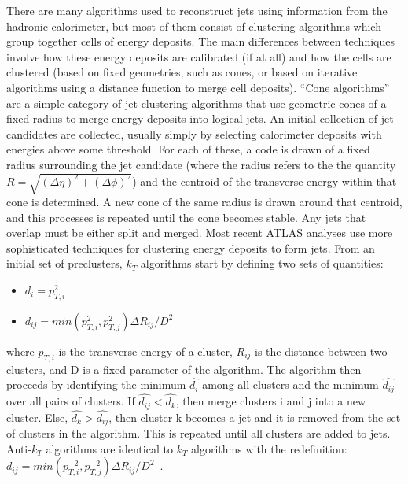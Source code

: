 There are many algorithms used to reconstruct jets using information from the hadronic calorimeter, but most of them consist of clustering algorithms which group together cells of energy deposits.
The main differences between techniques involve how these energy deposits are calibrated (if at all) and how the cells are clustered (based on fixed geometries, such as cones, or based on iterative algorithms using a distance function to merge cell deposits).
``Cone algorithms'' are a simple category of jet clustering algorithms that use geometric cones of a fixed radius to merge energy deposits into logical jets.
An initial collection of jet candidates are collected, usually simply by selecting calorimeter deposits with energies above some threshold.
For each of these, a code is drawn of a fixed radius surrounding the jet candidate (where the radius refers to the the quantity $R = \sqrt{(\Delta \eta)^2 + (\Delta \phi)^2}$) and the centroid of the transverse energy within that cone is determined.
A new cone of the same radius is drawn around that centroid, and this processes is repeated until the cone becomes stable.
Any jets that overlap must be either split and merged.
Most recent ATLAS analyses use more sophisticated techniques for clustering energy deposits to form jets.
From an initial set of preclusters, $k_T$ algorithms start by defining two sets of quantities:
\begin{itemize}
\item $d_{i} = p_{T,i}^2$
\item $d_{ij} = min(p_{T,i}^2, p_{T,j}^2)\Delta R_{ij} / D^2$
\end{itemize}
where $p_{T,i}$ is the transverse energy of a cluster, $R_{ij}$ is the distance between two clusters, and D is a fixed parameter of the algorithm.
The algorithm then proceeds by identifying the minimum $\hat{d_{i}}$ among all clusters and the minimum $\hat{d_{ij}}$ over all pairs of clusters.
If $\hat{d_{ij}} < \hat{d_{k}}$, then merge clusters i and j into a new cluster.
Else, $\hat{d_{k}} > \hat{d_{ij}}$, then cluster k becomes a jet and it is removed from the set of clusters in the algorithm.
This is repeated until all clusters are added to jets.
Anti-$k_T$ algorithms are identical to $k_T$ algorithms with the redefinition: $d_{ij} = min(p_{T,i}^{-2}, p_{T,j}^{-2})\Delta R_{ij} / D^2$~\cite{Cacciari:2008gp}.



